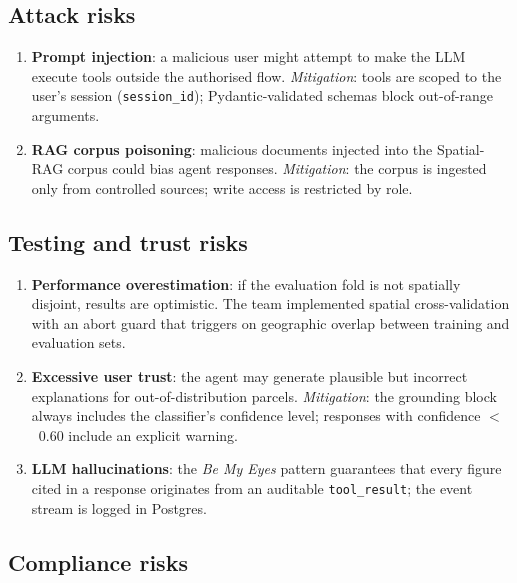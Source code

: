 \documentclass{article}
\begin{document}
\subsection{Attack risks}

\begin{enumerate}[leftmargin=*]
    \item \textbf{Prompt injection}: a malicious user might attempt to
    make the LLM execute tools outside the authorised flow.
    \textit{Mitigation}: tools are scoped to the user's session
    (\texttt{session\_id}); Pydantic-validated schemas block out-of-range
    arguments.

    \item \textbf{RAG corpus poisoning}: malicious documents injected into
    the Spatial-RAG corpus could bias agent responses.
    \textit{Mitigation}: the corpus is ingested only from controlled
    sources; write access is restricted by role.
\end{enumerate}

\subsection{Testing and trust risks}

\begin{enumerate}[leftmargin=*]
    \item \textbf{Performance overestimation}: if the evaluation fold is
    not spatially disjoint, results are optimistic. The team implemented
    spatial cross-validation with an abort guard that triggers on
    geographic overlap between training and evaluation sets.

    \item \textbf{Excessive user trust}: the agent may generate plausible
    but incorrect explanations for out-of-distribution parcels.
    \textit{Mitigation}: the grounding block always includes the
    classifier's confidence level; responses with confidence $<$~0.60
    include an explicit warning.

    \item \textbf{LLM hallucinations}: the \textit{Be My Eyes} pattern
    guarantees that every figure cited in a response originates from an
    auditable \texttt{tool\_result}; the event stream is logged in
    Postgres.
\end{enumerate}

\subsection{Compliance risks}
\end{document}
